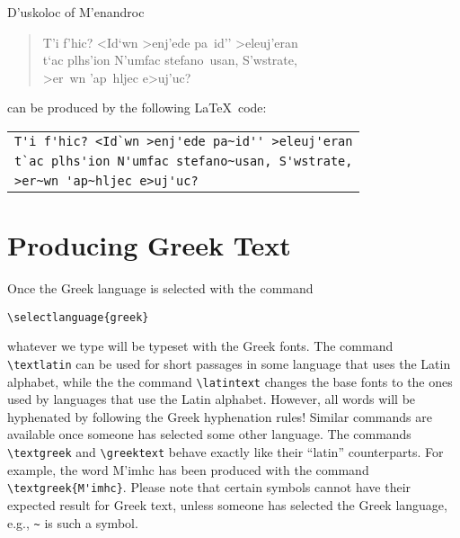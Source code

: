 \documentclass[11pt]{article}
\newcommand{\sg}{\selectlanguage{greek}}
\newcommand{\sa}{\selectlanguage{american}}
\begin{document}
\textgreek{D'uskoloc} of \textgreek{M'enandroc}
\sg
\begin{quote}
T'i f'hic? <Id`wn >enj'ede pa~id'' >eleuj'eran\\
t`ac plhs'ion N'umfac stefano~usan, S'wstrate,\\
>er~wn 'ap~hljec e>uj'uc?
\end{quote}
\sa can be produced by the following \LaTeX\ code:
\begin{center}
\begin{tabular}{l}
\verb+T'i f'hic? <Id`wn >enj'ede pa~id'' >eleuj'eran+\\
\verb+t`ac plhs'ion N'umfac stefano~usan, S'wstrate,+\\
\verb+>er~wn 'ap~hljec e>uj'uc?+
\end{tabular}
\end{center}
\section{Producing Greek Text}
Once the Greek language is selected with the command
\begin{center}
\verb+\selectlanguage{greek}+
\end{center}
whatever we type will be typeset with the Greek fonts. The command
\verb+\textlatin+ can be used for short passages in some language that
uses the Latin alphabet, while the the command \verb+\latintext+ changes
the base fonts to the ones used by languages that use the Latin alphabet.
However, all words will be hyphenated by following the Greek hyphenation
rules! Similar commands are available once someone has selected some
other language. The commands \verb+\textgreek+ and \verb+\greektext+
behave exactly like their ``latin'' counterparts. For example, the
word \textgreek{M'imhc} has been produced with the command 
\verb+\textgreek{M'imhc}+. Please note that certain symbols cannot have
their expected result for Greek text, unless someone has selected the Greek 
language, e.g., \verb+~+ is such a symbol.
\end{document}
